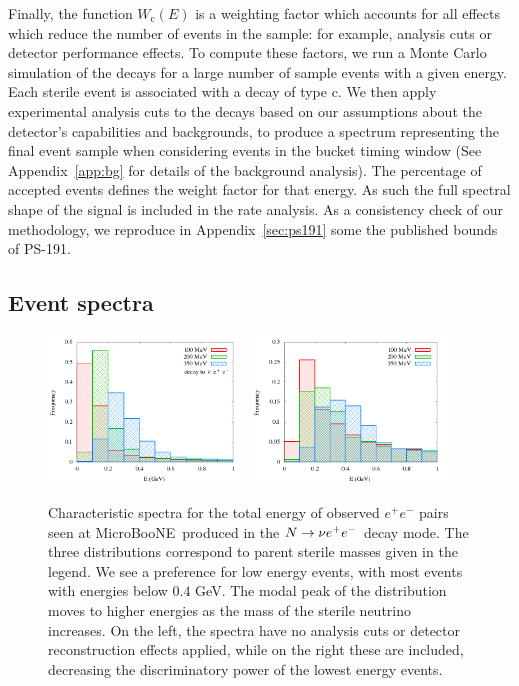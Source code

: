 \documentclass[11pt, a4paper]{article}
\newcommand{\refapp}[1]{Appendix~\ref{#1}}
\def\muboone{MicroBooNE}
\def\ster{\ensuremath N}
\begin{document}
%
Finally, the function $W_\text{c}(E)$ is a weighting factor which accounts for
all effects which reduce the number of events in the sample: for example,
analysis cuts or detector performance effects.
%
To compute these factors, we run a Monte Carlo simulation of the decays for a
large number of sample events with a given energy. Each sterile event is
associated with a decay of type $\text{c}$. We then apply experimental analysis
cuts to the decays based on our assumptions about the detector's capabilities
and backgrounds, to produce a spectrum representing the final event sample when
considering events in the bucket timing window (See \refapp{app:bg} for
details of the background analysis). The percentage of accepted events defines
the weight factor for that energy. As such the full spectral shape of the
signal is included in the rate analysis. As a consistency check of our
methodology, we reproduce in \refapp{sec:ps191} some the published
bounds of PS-191. 


\subsection{\label{sec:eventspectra}Event spectra}

\begin{figure}[t]
%
\center
%
\includegraphics[width=0.47\textwidth]{figures/spectrum_ee_truth.png} \includegraphics[width=0.47\textwidth]{figures/spectrum_ee_truth_cuts.png}
%
\caption{\label{fig:spectrum_ee} Characteristic spectra for the total energy of observed  $e^+e^-$ pairs seen at \muboone\ produced in the $\ster \to \nu e^+e^-$ decay mode. The three distributions correspond to parent sterile masses given in the legend. We see a preference for low energy events, with most events with energies below $0.4$ GeV. The modal peak of the distribution moves to higher energies as the mass of the sterile neutrino increases. On the left, the spectra have no analysis cuts or detector reconstruction effects applied, while on the right these are included, decreasing the discriminatory power of the lowest energy events.}
%
\end{figure}
\end{document}
